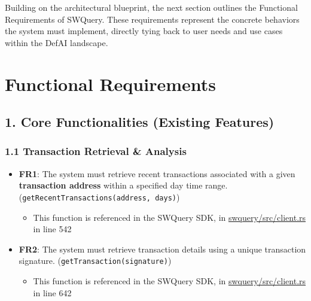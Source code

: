 \documentclass[
]{article}
\providecommand{\tightlist}{%
  \setlength{\itemsep}{0pt}\setlength{\parskip}{0pt}}
\begin{document}
Building on the architectural blueprint, the next section outlines the Functional Requirements of SWQuery. These requirements represent the concrete behaviors the system must implement, directly tying back to user needs and use cases within the DefAI landscape.

\hypertarget{functional-requirements}{%
\section{\texorpdfstring{\textbf{Functional
Requirements}}{Functional Requirements}}\label{functional-requirements}}

\hypertarget{core-functionalities-existing-features}{%
\subsection{\texorpdfstring{\textbf{1. Core Functionalities (Existing
Features)}}{1. Core Functionalities (Existing Features)}}\label{core-functionalities-existing-features}}

\hypertarget{transaction-retrieval-analysis}{%
\subsubsection{\texorpdfstring{\textbf{1.1 Transaction Retrieval \&
Analysis}}{1.1 Transaction Retrieval \& Analysis}}\label{transaction-retrieval-analysis}}

\begin{itemize}
\tightlist
\item
  \textbf{FR1}: The system must retrieve recent transactions associated
  with a given \textbf{transaction address} within a specified day time
  range. (\texttt{getRecentTransactions(address,\ days)})

  \begin{itemize}
  \tightlist
  \item
    This function is referenced in the SWQuery SDK, in
    \href{https://github.com/SWQuery/swquery/blob/main/swquery/src/client.rs}{swquery/src/client.rs}
    in line 542
  \end{itemize}
\item
  \textbf{FR2}: The system must retrieve transaction details using a
  unique transaction signature. (\texttt{getTransaction(signature)})

  \begin{itemize}
  \tightlist
  \item
    This function is referenced in the SWQuery SDK, in
    \href{https://github.com/SWQuery/swquery/blob/main/swquery/src/client.rs}{swquery/src/client.rs}
    in line 642
  \end{itemize}
\end{itemize}
\end{document}
